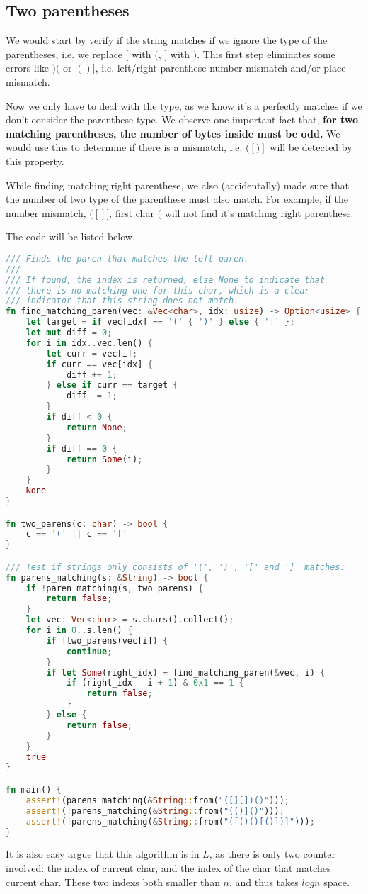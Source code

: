 \subsection*{Two parentheses}

We would start by verify if the string matches if we ignore the type of the parentheses, i.e. we replace $[$ with $($, $]$ with $)$.
This first step eliminates some errors like $)($ or $()]$, i.e. left/right parenthese number mismatch and/or place mismatch.

Now we only have to deal with the type, as we know it's a perfectly matches if we don't consider the parenthese type.
We observe one important fact that, \textbf{for two matching parentheses, the number of bytes inside must be odd.}
We would use this to determine if there is a mismatch, i.e. $([)]$ will be detected by this property.

While finding matching right parenthese, we also (accidentally) made sure that the number of two type of the parenthese must also match.
For example, if the number mismatch, $([]]$, first char $($ will not find it's matching right parenthese.

The code will be listed below.

\begin{lstlisting}[language=Rust]
/// Finds the paren that matches the left paren.
///
/// If found, the index is returned, else None to indicate that
/// there is no matching one for this char, which is a clear
/// indicator that this string does not match.
fn find_matching_paren(vec: &Vec<char>, idx: usize) -> Option<usize> {
    let target = if vec[idx] == '(' { ')' } else { ']' };
    let mut diff = 0;
    for i in idx..vec.len() {
        let curr = vec[i];
        if curr == vec[idx] {
            diff += 1;
        } else if curr == target {
            diff -= 1;
        }
        if diff < 0 {
            return None;
        }
        if diff == 0 {
            return Some(i);
        }
    }
    None
}

fn two_parens(c: char) -> bool {
    c == '(' || c == '['
}

/// Test if strings only consists of '(', ')', '[' and ']' matches.
fn parens_matching(s: &String) -> bool {
    if !paren_matching(s, two_parens) {
        return false;
    }
    let vec: Vec<char> = s.chars().collect();
    for i in 0..s.len() {
        if !two_parens(vec[i]) {
            continue;
        }
        if let Some(right_idx) = find_matching_paren(&vec, i) {
            if (right_idx - i + 1) & 0x1 == 1 {
                return false;
            }
        } else {
            return false;
        }
    }
    true
}

fn main() {
    assert!(parens_matching(&String::from("([][])()")));
    assert!(!parens_matching(&String::from("(()]()")));
    assert!(!parens_matching(&String::from("([()()[()])]")));
}
\end{lstlisting}

It is also easy argue that this algorithm is in $L$, as there is only two counter involved:
the index of current char, and the index of the char that matches current char.
These two indexs both smaller than $n$, and thus takes $log n$ space.


